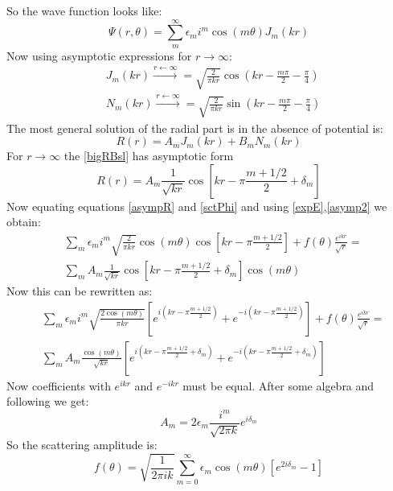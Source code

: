 So the wave function looks like:
\begin{equation}
 \Psi(r,\theta) = \sum_m^{\infty}{\epsilon_m i^m \cos(m\theta)J_m(kr)}
\end{equation}
Now using asymptotic expressions for $ r \rightarrow \infty $:
\begin{equation}\label{asymp2}
\begin{split}
& J_m(kr) \xrightarrow{r \leftarrow \infty}  = \sqrt{\frac{2}{\pi k r}}\cos\left(kr - \frac{m\pi}{2} - \frac{\pi}{4}\right) \\[.7em]
& N_m(kr) \xrightarrow{r \leftarrow \infty}  = \sqrt{\frac{2}{\pi k r}}\sin\left(kr - \frac{m\pi}{2} - \frac{\pi}{4}\right)
\end{split}
\end{equation}
The most general solution of the radial part is in the absence of potential is:
\begin{equation}\label{bigRBsl}
R(r) = A_mJ_m(kr) + B_mN_m(kr) 
\end{equation}
For $ r \rightarrow\infty $ the \eqref{bigRBsl} has asymptotic form
\begin{equation}\label{asympR}
R(r) = A_m\frac{1}{\sqrt{kr}}\cos\left[kr-\pi\frac{m + 1/2}{2} + \delta_m\right]
\end{equation}
Now equating equations \eqref{asympR} and \eqref{sctPhi} and using \eqref{expE},\eqref{asymp2} we obtain:
\begin{equation}\label{asymR2}
\begin{split}
& \sum_m{\epsilon_m i^m\sqrt{\frac{2}{\pi kr}}\cos(m\theta)\cos\left[kr-\pi\frac{m + 1/2}{2}\right]} + f(\theta)\frac{e^{ikr}}{\sqrt{r}} = \\[.7em]
& \sum_m{A_m\frac{1}{\sqrt{kr}}\cos\left[kr-\pi\frac{m + 1/2}{2} + \delta_m\right]\cos(m\theta)}
\end{split}
\end{equation}
Now this can be rewritten as:
\begin{equation}\label{asyR3}
\begin{split}
& \sum_m{\epsilon_m i^m \sqrt{\frac{2\cos(m\theta)}{\pi kr}}\left[e^{i\left(kr-\pi\frac{m + 1/2}{2}\right)} + e^{-i\left(kr-\pi\frac{m + 1/2}{2}\right)}\right]}
+ f(\theta)\frac{e^{ikr}}{\sqrt{r}} = \\[.7em]
& \sum_m{A_m\frac{\cos(m\theta)}{\sqrt{kr}}\left[e^{i\left(kr-\pi\frac{m + 1/2}{2} + \delta_m\right)} + e^{-i\left(kr-\pi\frac{m + 1/2}{2} + \delta_m\right)}\right]}
\end{split}
\end{equation}
Now coefficients with $ e^{ikr} $ and $ e^{-ikr} $ must be equal. After some algebra and following \cite{2DScatter2} we get:
\begin{equation}\label{AandDelta}
A_m = 2\epsilon_m \frac{i^m}{\sqrt{2\pi k}}e^{i\delta_m}
\end{equation}
So the scattering amplitude is:
\begin{equation}
f(\theta) = \sqrt{\frac{1}{2\pi i k}}\sum_{m=0}^{\infty}{\epsilon_m\cos(m\theta)\left[e^{2i\delta_m}-1\right]}
\end{equation}

